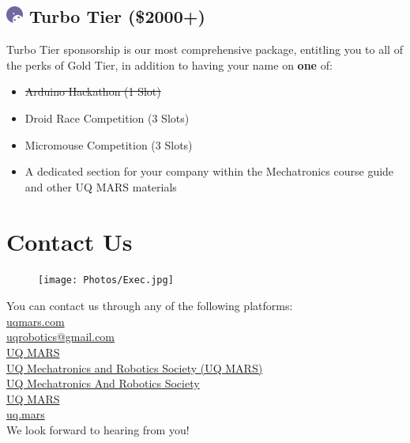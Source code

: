 \documentclass[a4paper,12pt]{report}
\begin{document}
\subsection*{
    \includegraphics[width=1em]{Sponsor Icons/Turbo.png}
    \textcolor{turbo_purple}{Turbo Tier (\$2000+)}
}
Turbo Tier sponsorship is our most comprehensive package, entitling you to all of the perks of Gold Tier, in addition to having your name on \textbf{one} of:
\begin{itemize}
    \item \st{Arduino Hackathon (1 Slot)}
    \item Droid Race Competition (3 Slots)
    \item Micromouse Competition (3 Slots)
    \item A dedicated section for your company within the Mechatronics course guide and other UQ MARS materials
\end{itemize}

\newpage

\section*{Contact Us}
\begin{figure}[H]
    \centering
    \texttt{[image: Photos/Exec.jpg]}
\end{figure}

\large
\onehalfspacing
You can contact us through any of the following platforms: \\
\faLink{} \href{https://www.uqmars.com}{uqmars.com} \\
\faEnvelope{} \href{mailto:uqrobotics@gmail.com}{uqrobotics@gmail.com} \\
\faFacebookSquare{} \href{https://facebook.com/UQMARS}{UQ MARS} \\
\faLinkedinSquare{} \href{https://linkedin.com/company/uq-mars}{UQ Mechatronics and Robotics Society (UQ MARS)} \\
\faGithubSquare{} \href{https://github.com/uqmars}{UQ Mechatronics And Robotics Society} \\
\faYoutubePlay{} \href{https://www.youtube.com/channel/UCH3GjoKLL3R_1ayjkn9C78A}{UQ MARS} \\
\faInstagram{} \href{https://www.instagram.com/uq.mars/}{uq.mars} \\
We look forward to hearing from you!
\end{document}
